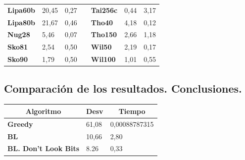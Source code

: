 \documentclass[a4paper, 12pt]{article}
\begin{document}
\begin{table}[H]
\begin{tabular}{|l|l|l|l|l|l|l|}
\textbf{Lipa60b}                    & 20,45                              & 0,27                                 &                                & \textbf{Tai256c}                   & 0,44                               & 3,17                                 \\ \cline{1-3} \cline{5-7} 
\textbf{Lipa80b}                    & 21,67                              & 0,46                                 &                                & \textbf{Tho40}                     & 4,18                               & 0,12                                 \\ \cline{1-3} \cline{5-7} 
\textbf{Nug28}                      & 5,46                               & 0,07                                 &                                & \textbf{Tho150}                    & 2,66                               & 1,18                                 \\ \cline{1-3} \cline{5-7} 
\textbf{Sko81}                      & 2,54                               & 0,50                                 &                                & \textbf{Wil50}                     & 2,19                               & 0,17                                 \\ \cline{1-3} \cline{5-7} 
\textbf{Sko90}                      & 1,79                               & 0,50                                 &                                & \textbf{Wil100}                    & 1,01                               & 0,55                                 \\ \cline{1-3} \cline{5-7} 
\end{tabular}
\end{table}
      
      \newpage
      \subsection{Comparación de los resultados. Conclusiones.}
\begin{table}[H]
\centering
\label{my-label}
\begin{tabular}{|l|l|l|}
\hline
\multicolumn{1}{|c|}{\textbf{Algoritmo}} & \textbf{Desv} & \multicolumn{1}{c|}{\textbf{Tiempo}} \\ \hline
\textbf{Greedy}                          & 61,08         & 0,00088787315                        \\ \hline
\textbf{BL}                              & 10,66         & 2,80                                 \\ \hline
\textbf{BL. Don't Look Bits}             & 8.26          & 0,33                                 \\ \hline
\end{tabular}
\end{table}
      
\end{document}
